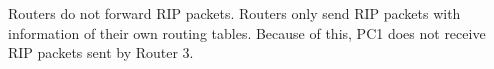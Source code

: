 Routers do not forward RIP packets. Routers only send RIP packets with information of their own routing tables. Because of this, PC1 does not receive RIP packets sent by Router 3.